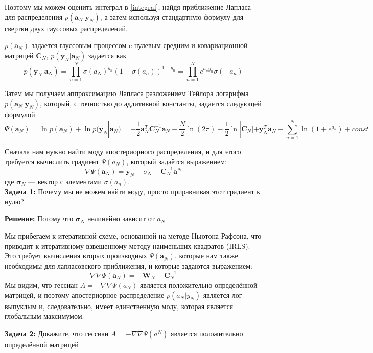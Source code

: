 Поэтому мы можем оценить интеграл в \ref{integral}, найдя приближение Лапласа
для распределения $p(\mathbf{a}_{N}|\mathbf{y}_{N})$, а затем используя стандартную формулу для
свертки двух гауссовых распределений.

$p(\mathbf{a}_{N})$ задается гауссовым процессом c нулевым средним и ковариационной матрицей $\mathbf{C}_{N}$, $p(\mathbf{y}_{N}|\mathbf{a}_{N})$ задается как
\[
p(\mathbf{y}_{N}|\mathbf{a}_{N})=\displaystyle \prod_{n=1}^{N}\sigma(a_{N})^{y_n}(1-\sigma(a_{n}))^{1-y_n} =
\displaystyle \prod_{n=1}^{N} e^{a_ny_n}\sigma(-a_n)\]

Затем мы получаем аппроксимацию Лапласа разложением Тейлора логарифма $p(\mathbf{a}_{N}|\mathbf{y}_N)$, который, с точностью до аддитивной константы, задается следующей формулой
\begin{equation}
\label{PSI}
 \Psi(\mathbf{a}_N) = \ln p(\mathbf{a}_{N})+\ln p(\mathbf{y}_N|\mathbf{a}_N)
 = -\frac{1}{2}\mathbf{a}^{T}_N\mathbf{C}^{-1}_N \mathbf{a}_N-\frac{N}{2} \ln(2\pi)-\frac{1}{2}\ln|\mathbf{C}_N|+\mathbf{y}^T_N\mathbf{a}_N-\displaystyle \sum^{N}_{n=1}\ln(1+e^{a_n})+const
\end{equation}

Сначала нам нужно найти моду апостериорного распределения, и для этого требуется вычислить градиент $\Psi(a_N)$, который задаётся выражением:
\[
\nabla \Psi(\mathbf{a}_N) = \mathbf{y}_N - \sigma_{N} - \mathbf{C}_{N}^{-1}\mathbf{a}^N
\]
где $\mathbf{\sigma}_N$ — вектор с элементами $\sigma(a_n)$. \\

\textbf{Задача 1:}
Почему мы не можем найти моду, просто приравнивая этот градиент к нулю? 

\textbf{Решение:}
Потому что $\mathbf{\sigma}_N$ нелинейно зависит от $a_N$ 

Мы прибегаем к итеративной схеме, основанной на методе Ньютона-Рафсона, что приводит к итеративному взвешенному методу наименьших квадратов (IRLS). Это требует вычисления вторых производных $\Psi(\mathbf{a}_N)$, которые нам также необходимы для лапласовского приближения, и которые задаются выражением:
\[
\nabla \nabla \Psi(\mathbf{a}_N) = -\mathbf{W}_{N} - \mathbf{C}_{N}^{-1} 
\]
Мы видим, что гессиан $A=-\nabla \nabla \Psi(a_N)$ является положительно определённой матрицей, и поэтому апостериорное распределение $p(a_N|y_N)$ является лог-выпуклым и, следовательно, имеет единственную моду, которая является глобальным максимумом.

\textbf{Задача 2:}
Докажите, что гессиан $A=-\nabla \nabla \Psi(a^N)$ является положительно определённой матрицей


